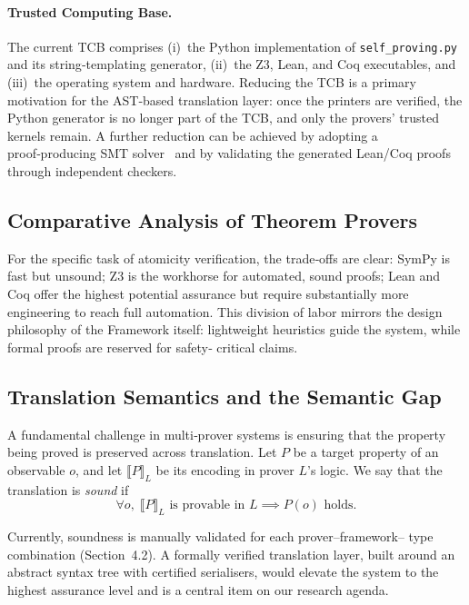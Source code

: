 \paragraph{Trusted Computing Base.}
The current TCB comprises (i)~the Python implementation of
\texttt{self\_proving.py} and its string‑templating generator,
(ii)~the Z3, Lean, and Coq executables, and (iii)~the operating system
and hardware.  Reducing the TCB is a primary motivation for the
AST‑based translation layer: once the printers are verified, the
Python generator is no longer part of the TCB, and only the provers'
trusted kernels remain.  A further reduction can be achieved by
adopting a proof‑producing SMT solver~\cite{deepspec2016} and by
validating the generated Lean/Coq proofs through independent checkers.

\subsection{Comparative Analysis of Theorem Provers}



For the specific task of atomicity verification, the trade‑offs are clear:
SymPy is fast but unsound; Z3 is the workhorse for automated, sound proofs;
Lean and Coq offer the highest potential assurance but require substantially
more engineering to reach full automation.  This division of labor mirrors
the design philosophy of the \Apeiron{} Framework itself: lightweight
heuristics guide the system, while formal proofs are reserved for safety‑
critical claims.

\subsection{Translation Semantics and the Semantic Gap}

A fundamental challenge in multi‑prover systems is ensuring that the
property being proved is preserved across translation.  Let $P$ be a
target property of an observable $o$, and let $\llbracket P \rrbracket_L$
be its encoding in prover $L$'s logic.  We say that the translation is
\emph{sound} if
\[
\forall o,\; \llbracket P \rrbracket_L \text{ is provable in } L
\implies P(o) \text{ holds}.
\]

Currently, soundness is manually validated for each prover–framework–
type combination (Section~4.2).  A formally verified translation layer,
built around an abstract syntax tree with certified serialisers, would
elevate the system to the highest assurance level and is a central item on
our research agenda.

